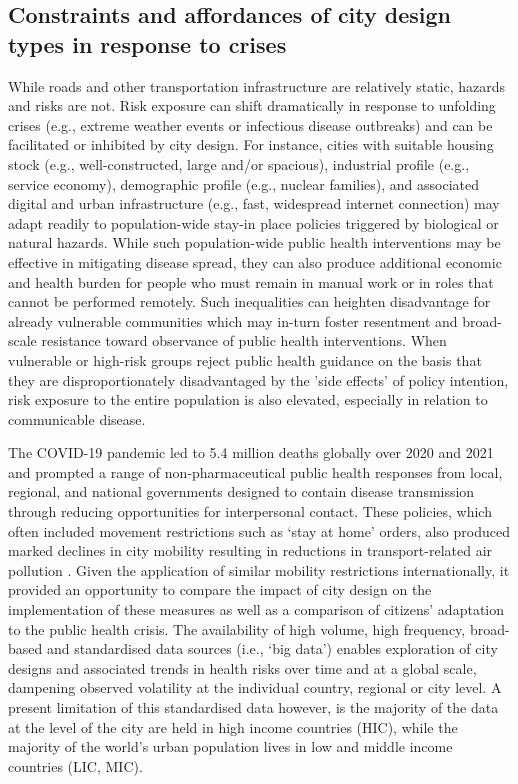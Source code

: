 \documentclass[preprint,10pt]{elsarticle} %
\begin{document}
\subsection*{Constraints and affordances of city design types in response to crises}
While roads and other transportation infrastructure are relatively static, hazards and risks are not. Risk exposure can shift dramatically in response to unfolding crises (e.g., extreme weather events or infectious disease outbreaks) and can be facilitated or inhibited by city design. For instance, cities with suitable housing stock (e.g., well-constructed, large and/or spacious), industrial profile (e.g., service economy), demographic profile (e.g., nuclear families), and associated digital and urban infrastructure (e.g., fast, widespread internet connection) may adapt readily to population-wide stay-in place policies triggered by biological or natural hazards\cite{hale2021global}. While such population-wide public health interventions may be effective in mitigating disease spread, they can also produce additional economic and health burden for people who must remain in manual work or in roles that cannot be performed remotely\cite{CraigWFH,Vyas2021}. Such inequalities can heighten disadvantage for already vulnerable communities\cite{martin2020fighting} which may in-turn foster resentment and broad-scale resistance toward observance of public health interventions\cite{de2016sustainability}. When vulnerable or high-risk groups reject public health guidance on the basis that they are disproportionately disadvantaged by the 'side effects' of policy intention, risk exposure to the entire population is also elevated, especially in relation to communicable disease\cite{koopman2005control}.

The COVID-19 pandemic led to 5.4 million deaths globally over 2020 and 2021 \cite{Taylor2022} and prompted a range of non-pharmaceutical public health responses from local, regional, and national governments\cite{Hunter2023LPH} designed to contain disease transmission through reducing opportunities for interpersonal contact. These policies, which often included movement restrictions such as `stay at home' orders, also produced marked declines in city mobility resulting in reductions in transport-related air pollution \cite{Forster2020,He2020,LeQuere2020,Venter2020}. Given the application of similar mobility restrictions internationally, it provided an opportunity to compare the impact of city design on the implementation of these measures as well as a comparison of citizens' adaptation to the public health crisis. The availability of high volume, high frequency, broad-based and standardised data sources (i.e., `big data') enables exploration of city designs and associated trends in health risks over time and at a global scale, dampening observed volatility at the individual country, regional or city level. A present limitation of this standardised data however, is the majority of the data at the level of the city are held in high income countries (HIC), while the majority of the world's urban population lives in low and middle income countries (LIC, MIC)\cite{Smit2021}.
\end{document}
